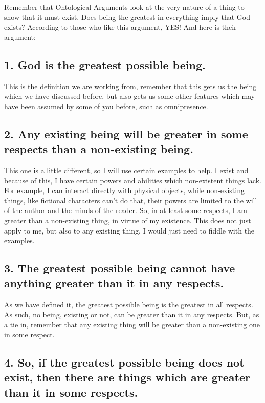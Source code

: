 Remember that Ontological Arguments look at the very nature of a thing to show that it must exist. Does being the greatest in everything imply that God exists? According to those who like this argument, YES! And here is their argument:

\subsection{1. God is the greatest possible being.}

This is the definition we are working from, remember that this gets us the being which we have discussed before, but also gets us some other features which may have been assumed by some of you before, such as omnipresence. 

\subsection{2. Any existing being will be greater in some respects than a non-existing being.}

This one is a little different, so I will use certain examples to help. I exist and because of this, I have certain powers and abilities which non-existent things lack. For example, I can interact directly with physical objects, while non-existing things, like fictional characters can't do that, their powers are limited to the will of the author and the minds of the reader. So, in at least some respects, I am greater than a non-existing thing, in virtue of my existence. This does not just apply to me, but also to any existing thing, I would just need to fiddle with the examples. 

\subsection{3. The greatest possible being cannot have anything greater than it in any respects.}

As we have defined it, the greatest possible being is the greatest in all respects. As such, no being, existing or not, can be greater than it in any respects. But, as a tie in, remember that any existing thing will be greater than a non-existing one in some respect.

\subsection{4. So, if the greatest possible being does not exist, then there are things which are greater than it in some respects.}

